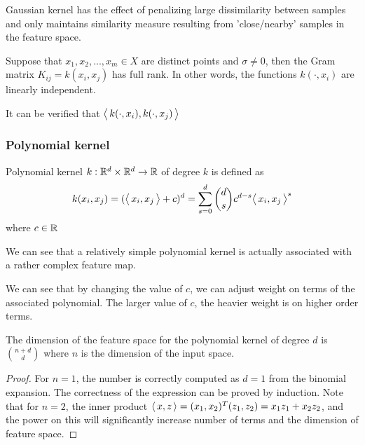 \begin{refsection}
\begin{remark}
	Gaussian kernel has the effect of penalizing large dissimilarity between samples and only maintains similarity measure resulting from 'close/nearby' samples in the feature space. 
\end{remark}


\begin{lemma}
	\cite[47]{scholkopf2002learning}Suppose that $x_1,x_2,...,x_m \in X$ are distinct points and $\sigma \neq 0$, then the Gram matrix $K_{ij} = k(x_i,x_j)$ has full rank.
	In other words, the functions $k(\cdot,x_i)$ are linearly independent.
\end{lemma}

\begin{remark}
	It can be verified that ${\left< \, k(\cdot,x_i),k(\cdot,x_j) \, \right>}$
\end{remark}

\subsubsection{Polynomial kernel}
\begin{definition}
	\cite[482]{murphy2012machine}\cite[293]{shawe2004kernel}Polynomial kernel $k:\mathbb{R}^d\times \mathbb{R}^d \to \mathbb{R}$ of degree $k$ is defined as
	$$k(x_i,x_j) = ({\left< \, x_i,x_j \, \right>} + c)^d = \sum_{s=0}^d \binom{d}{s}c^{d-s}{\left< \, x_i,x_j \, \right>}^s$$
	where $c\in \mathbb{R}$
\end{definition}

\begin{remark}
	We can see that a relatively simple polynomial kernel is actually associated with a rather complex feature map. 
\end{remark}

\begin{remark} We can see that by changing the value of $c$, we can adjust weight on terms of the associated polynomial. The larger value of $c$, the heavier weight is on higher order terms.
\end{remark}

\begin{lemma}\cite[293]{shawe2004kernel}
	The dimension of the feature space for the polynomial kernel of degree $d$ is $\binom{n+d}{d}$
	where $n$ is the dimension of the input space.
\end{lemma}
\begin{proof}
	For $n=1$, the number is correctly computed as $d=1$ from the binomial expansion. The correctness of the expression can be proved by induction. Note that for $n=2$, the inner product ${\left< \, x,z \, \right>} = (x_1,x_2)^T(z_1,z_2)=x_1z_1 + x_2z_2$, and the power on this will significantly increase number of terms and the dimension of feature space.
\end{proof}



\end{refsection}
